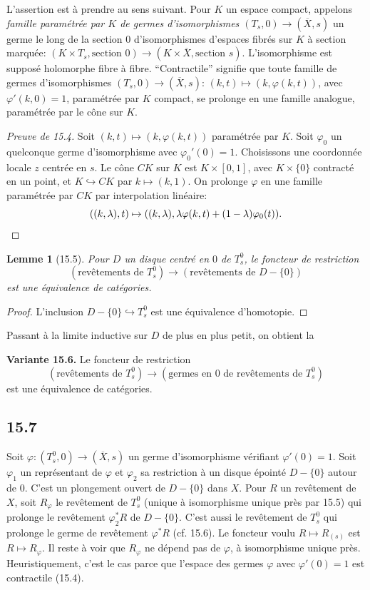 \documentclass[12pt,a4paper]{article}
\theoremstyle{plain}
\newtheorem{lemma}[theorem]{Lemme}
\theoremstyle{definition}
\theoremstyle{remark}
\begin{document}
L'assertion est à prendre au sens suivant. Pour $K$ un espace compact, appelons \emph{famille paramétrée par $K$ de germes d'isomorphismes $(T_s, 0) \to (\overline{X}, s)$} un germe le long de la section $0$ d'isomorphismes d'espaces fibrés sur $K$ à section marquée: $(K \times T_s, \text{section } 0) \to (K \times \overline{X}, \text{section } s)$. L'isomorphisme est supposé holomorphe fibre à fibre. ``Contractile'' signifie que toute famille de germes d'isomorphismes $(T_s, 0) \to (\overline{X}, s)$: $(k, t) \mapsto (k, \varphi(k,t))$, avec $\varphi'(k, 0) = 1$, paramétrée par $K$ compact, se prolonge en une famille analogue, paramétrée par le cône sur $K$.

\begin{proof}[Preuve de 15.4]
Soit $(k, t) \mapsto (k, \varphi(k,t))$ paramétrée par $K$. Soit $\varphi_0$ un quelconque germe d'isomorphisme avec $\varphi_0'(0) = 1$. Choisissons une coordonnée locale $z$ centrée en $s$. Le cône $CK$ sur $K$ est $K \times [0, 1]$, avec $K \times \{0\}$ contracté en un point, et $K \hookrightarrow CK$ par $k \mapsto (k, 1)$. On prolonge $\varphi$ en une famille paramétrée par $CK$ par interpolation linéaire:
\[
((k, \lambda), t) \mapsto ((k, \lambda), \lambda \varphi(k,t) + (1-\lambda)\varphi_0(t)). \qedhere
\]
\end{proof}

\begin{lemma}[15.5]
Pour $D$ un disque centré en $0$ de $T_s^0$, le foncteur de restriction
\[
(\text{revêtements de } T_s^0) \to (\text{revêtements de } D - \{0\})
\]
est une équivalence de catégories.
\end{lemma}

\begin{proof}
L'inclusion $D - \{0\} \hookrightarrow T_s^0$ est une équivalence d'homotopie.
\end{proof}

Passant à la limite inductive sur $D$ de plus en plus petit, on obtient la

\textbf{Variante 15.6.} Le foncteur de restriction
\[
(\text{revêtements de } T_s^0) \to (\text{germes en } 0 \text{ de revêtements de } T_s^0)
\]
est une équivalence de catégories.

\subsection*{15.7}

Soit $\varphi : (T_s^0, 0) \to (\overline{X}, s)$ un germe d'isomorphisme vérifiant $\varphi'(0) = 1$. Soit $\varphi_1$ un représentant de $\varphi$ et $\varphi_2$ sa restriction à un disque épointé $D - \{0\}$ autour de $0$. C'est un plongement ouvert de $D - \{0\}$ dans $X$. Pour $R$ un revêtement de $X$, soit $R_\varphi$ le revêtement de $T_s^0$ (unique à isomorphisme unique près par 15.5) qui prolonge le revêtement $\varphi_2^* R$ de $D - \{0\}$. C'est aussi le revêtement de $T_s^0$ qui prolonge le germe de revêtement $\varphi^* R$ (cf. 15.6). Le foncteur voulu $R \mapsto R_{(s)}$ est $R \mapsto R_\varphi$. Il reste à voir que $R_\varphi$ ne dépend pas de $\varphi$, à isomorphisme unique près. Heuristiquement, c'est le cas parce que l'espace des germes $\varphi$ avec $\varphi'(0) = 1$ est contractile (15.4).
\end{document}
